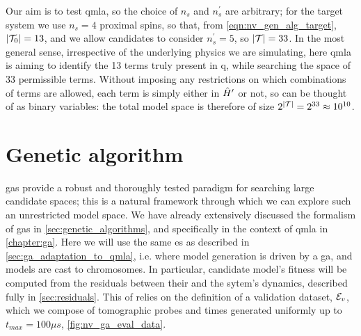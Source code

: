 Our aim is to test \gls{qmla}, so the choice of $n_s$ and $n_s^{\prime}$ are arbitrary; 
    for the target system we use $n_s=4$ proximal spins, 
    so that, from \cref{eqn:nv_gen_alg_target},  $\left\lvert \mathcal{T}_0 \right\rvert = 13$,
    and we allow candidates to consider $n_s^{\prime}=5$, 
    so $\left\lvert \mathcal{T} \right\rvert = 33$. 
In the most general sense, irrespective of the underlying physics we are simulating, 
    here \gls{qmla} is aiming to identify the 13 terms truly present in \gls{q}, 
    while searching the space of 33 permissible terms. 
Without imposing any restrictions on which combinations of terms are allowed, 
    each term is simply either in $\hat{H}^{\prime}$ or not, so can be thought of as binary variables:
    the total \gls{model space} is therefore of size $2^{\left\lvert \mathcal{T} \right\rvert}=2^{33} \approx 10^{10}$. 

\section{Genetic algorithm}
\Glspl{ga} provide a robust and thoroughly tested paradigm for searching large candidate spaces; 
    this is a natural framework through which we can explore such an unrestricted model space. 
We have already extensively discussed the formalism of \glspl{ga} in \cref{sec:genetic_algorithms}, 
    and specifically in the context of \gls{qmla} in \cref{chapter:ga}.
Here we will use the same \gls{es} as described in \cref{sec:ga_adaptation_to_qmla}, 
    i.e. where model generation is driven by a \gls{ga}, 
    and models are cast to \glspl{chromosome}. 
In particular, candidate model's fitness will be computed from the residuals
    between their and the sytem's dynamics, described fully in \cref{sec:residuals}. 
This \acrfull{of} relies on the definition of a validation dataset, ${ \mathcal{E} }_v$,
    which we compose of tomographic probes and times generated uniformly up to 
    $t_{max} = 100 \mu s$, \cref{fig:nv_ga_eval_data}. 

